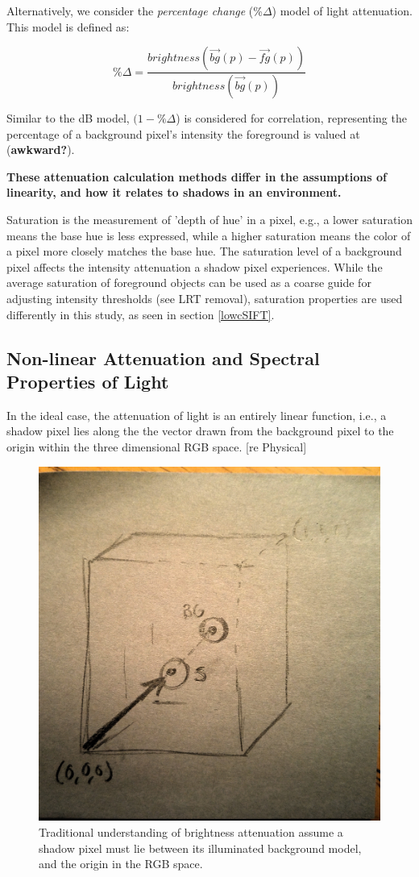 \documentclass[12pt]{report}
\begin{document}
Alternatively, we consider the \textit{percentage change} (\%$\Delta$) model of light attenuation. This model is defined as:

\begin{equation}
\%\Delta = \dfrac{brightness(\vec{bg}(p) - \vec{fg}(p))}{brightness(\vec{bg}(p))}
\end{equation}

Similar to the dB model, $(1 - \%\Delta$) is considered for correlation, representing the percentage of a background pixel's intensity the foreground is valued at (\textbf{awkward?}).

\textbf{These attenuation calculation methods differ in the assumptions of linearity, and how it relates to shadows in an environment.}

Saturation is the measurement of 'depth of hue' in a pixel, e.g., a lower saturation means the base hue is less expressed, while a higher saturation means the color of a pixel more closely matches the base hue. The saturation level of a background pixel affects the intensity attenuation a shadow pixel experiences. While the average saturation of foreground objects can be used as a coarse guide for adjusting intensity thresholds (see LRT removal), saturation properties are used differently in this study, as seen in section \ref{lowcSIFT}.

\subsection{Non-linear Attenuation and Spectral Properties of Light} \label{nonlinearatten}

In the ideal case, the attenuation of light is an entirely linear function, i.e., a shadow pixel lies along the the vector drawn from the background pixel to the origin within the three dimensional RGB space. [re Physical]

\begin{figure}
  \centering
  \includegraphics[width=.5\linewidth]{figures/mockup_rgbcube.jpg}
  \caption{Traditional understanding of brightness attenuation assume a shadow pixel must lie between its illuminated background model, and the origin in the RGB space.}
  \label{fig:rgbcube}
\end{figure}
\end{document}

